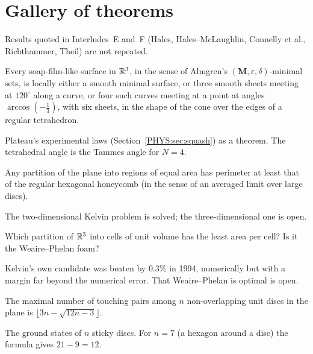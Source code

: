 \section{Gallery of theorems}
\label{PHYS:sec:gallery}

Results quoted in Interludes~E and~F (Hales, Hales--McLaughlin, Connelly et al., Richthammer, Theil) are not
repeated.

\begin{theorem}\label{PHYS:thm:taylor}
Every soap-film-like surface in $\mathbb{R}^3$, in the sense of Almgren's $(\mathbf M,\varepsilon,\delta)$-minimal sets, is
locally either a smooth minimal surface, or three smooth sheets meeting at $120^\circ$ along a curve, or
four such curves meeting at a point at angles $\arccos(-\frac13)$, with six sheets, in the shape of the cone over
the edges of a regular tetrahedron.
\end{theorem}
\noindent Plateau's experimental laws (Section~\ref{PHYS:sec:squash}) as a theorem. The tetrahedral angle is the
Tammes angle for $N=4$.

\begin{theorem}\label{PHYS:thm:honeycomb}
Any partition of the plane into regions of equal area has perimeter at least that of the regular hexagonal
honeycomb (in the sense of an averaged limit over large discs).
\end{theorem}
\noindent The two-dimensional Kelvin problem is solved; the three-dimensional one is open.

\begin{question}
Which partition of $\mathbb{R}^3$ into cells of unit volume has the least area per cell? Is it the Weaire--Phelan
foam?
\end{question}
\noindent Kelvin's own candidate was beaten by $0.3\%$ in 1994, numerically but with a margin far beyond the
numerical error. That Weaire--Phelan is optimal is open.

\begin{theorem}\label{PHYS:thm:harborth}
The maximal number of touching pairs among $n$ non-overlapping unit discs in the plane is
$\lfloor3n-\sqrt{12n-3}\rfloor$.
\end{theorem}
\noindent The ground states of $n$ sticky discs. For $n=7$ (a hexagon around a disc) the formula gives
$21-9=12$.

